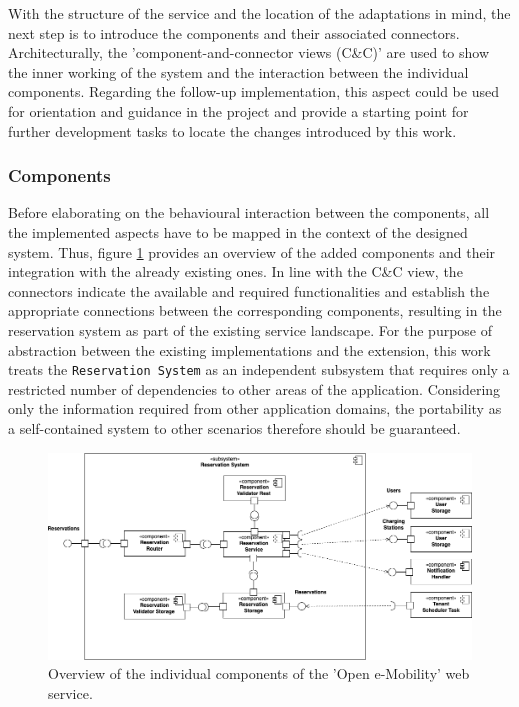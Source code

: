 \noindent With the structure of the service and the location of the adaptations in mind, the next step is to introduce the components and their associated connectors. Architecturally, the 'component-and-connector views (C\&C)' \cite[p.~136]{clements_documenting_2011} are used to show the inner working of the system and the interaction between the individual components. 
Regarding the follow-up implementation, this aspect could be used for orientation and guidance in the project and provide a starting point for further development tasks to locate the changes introduced by this work.

\subsubsection{Components}
\label{ch:Implementation:sec:Reservation System:ssec:Architectural Views:sssec:Components}

Before elaborating on the behavioural interaction between the components, all the implemented aspects have to be mapped in the context of the designed system. Thus, figure \ref{fig:component-view} provides an overview of the added components and their integration with the already existing ones.
In line with the C\&C view, the connectors indicate the available and required functionalities and establish the appropriate connections between the corresponding components, resulting in the reservation system as part of the existing service landscape.
For the purpose of abstraction between the existing implementations and the extension, this work treats the \texttt{Reservation System} as an independent subsystem that requires only a restricted number of dependencies to other areas of the application.
Considering only the information required from other application domains, the portability as a self-contained system to other scenarios therefore should be guaranteed.

\begin{figure}[h]
    \centering
    \includegraphics[scale=0.4]{resources/images/main/6_implementation/ReservationComponents.png}
    \caption{Overview of the individual components of the 'Open e-Mobility' \cite{noauthor_open_2023} web service.}
    \label{fig:component-view}
\end{figure}

